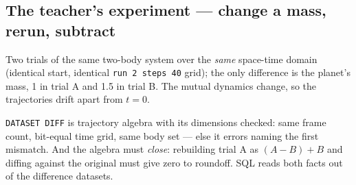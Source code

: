 \documentclass[11pt]{article}
\newcommand{\kw}[1]{\texttt{\uppercase{#1}}}
\newcommand{\code}[1]{\texttt{#1}}
\begin{document}
\subsection{The teacher's experiment --- change a mass, rerun, subtract}

Two trials of the same two-body system over the \emph{same}
space-time domain (identical start, identical \code{run 2 steps 40}
grid); the only difference is the planet's mass, 1 in trial A and 1.5
in trial B. The mutual dynamics change, so the trajectories drift
apart from $t = 0$.

\kw{dataset diff} is trajectory algebra with its dimensions checked:
same frame count, bit-equal time grid, same body set --- else it
errors naming the first mismatch. And the algebra must \emph{close}:
rebuilding trial A as $(A - B) + B$ and diffing against the original
must give zero to roundoff. SQL reads both facts out of the
difference datasets.
\end{document}
